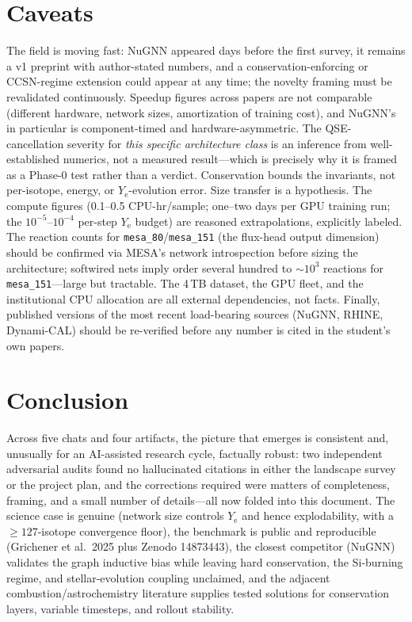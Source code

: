 \documentclass[11pt,a4paper]{article}
\newcommand{\Ye}{\ensuremath{Y_{\mathrm{e}}}}
\newcommand{\code}[1]{\texttt{#1}}
\begin{document}
\section{Caveats}

The field is moving fast: NuGNN appeared days before the first survey, it remains a v1 preprint with author-stated numbers, and a conservation-enforcing or CCSN-regime extension could appear at any time; the novelty framing must be revalidated continuously. Speedup figures across papers are not comparable (different hardware, network sizes, amortization of training cost), and NuGNN's in particular is component-timed and hardware-asymmetric. The QSE-cancellation severity for \emph{this specific architecture class} is an inference from well-established numerics, not a measured result---which is precisely why it is framed as a Phase-0 test rather than a verdict. Conservation bounds the invariants, not per-isotope, energy, or \Ye-evolution error. Size transfer is a hypothesis. The compute figures (0.1--0.5 CPU-hr/sample; one--two days per GPU training run; the $10^{-5}$--$10^{-4}$ per-step \Ye{} budget) are reasoned extrapolations, explicitly labeled. The reaction counts for \code{mesa\_80}/\code{mesa\_151} (the flux-head output dimension) should be confirmed via MESA's network introspection before sizing the architecture; softwired nets imply order several hundred to ${\sim}10^{3}$ reactions for \code{mesa\_151}---large but tractable. The 4\,TB dataset, the GPU fleet, and the institutional CPU allocation are all external dependencies, not facts. Finally, published versions of the most recent load-bearing sources (NuGNN, RHINE, Dynami-CAL) should be re-verified before any number is cited in the student's own papers.

\section{Conclusion}

Across five chats and four artifacts, the picture that emerges is consistent and, unusually for an AI-assisted research cycle, factually robust: two independent adversarial audits found no hallucinated citations in either the landscape survey or the project plan, and the corrections required were matters of completeness, framing, and a small number of details---all now folded into this document. The science case is genuine (network size controls \Ye{} and hence explodability, with a $\geq 127$-isotope convergence floor), the benchmark is public and reproducible (Grichener et al.\ 2025 plus Zenodo 14873443), the closest competitor (NuGNN) validates the graph inductive bias while leaving hard conservation, the Si-burning regime, and stellar-evolution coupling unclaimed, and the adjacent combustion/astrochemistry literature supplies tested solutions for conservation layers, variable timesteps, and rollout stability.
\end{document}
